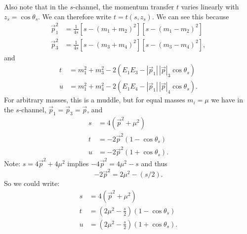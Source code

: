 \M
Also note that in the $s$-channel, the momentum transfer $t$ varies
linearly with $z_{s} = \cos\theta_{s}$. We can therefore write $t=t(s,z_{s})$.
We can see this because
\begin{subequations}
  \begin{align}
\vec{p}_{1}^{2} &= \frac{1}{4s}[s - (m_{1}+m_{2})^{2}][s - (m_{1}-m_{2})^{2}]\\
\vec{p}_{3}^{2} &= \frac{1}{4s}[s - (m_{3}+m_{4})^{2}][s - (m_{3}-m_{4})^{2}],
  \end{align}
\end{subequations}
and
\begin{subequations}
  \begin{align}
t &= m_{1}^{2} + m_{3}^{2} - 2(E_{1}E_{3} - |\vec{p}_{1}|\,|\vec{p}|_{3}\cos\theta_{s})\\
u &= m_{1}^{2} + m_{4}^{2} - 2(E_{1}E_{4} - |\vec{p}_{1}|\,|\vec{p}|_{4}\cos\theta_{s}).
  \end{align}
\end{subequations}
For arbitrary masses, this is a muddle, but for equal masses $m_{i}=\mu$
we have in the $s$-channel, $\vec{p}_{1}=\vec{p}_{3}=\vec{p}$, and
\begin{subequations}\label{eq:introduction:mandelstam-in-cm-frame-with-identical-masses}
  \begin{align}
    s &= 4(\vec{p}^{2}+\mu^{2})\\
    t &= -2\vec{p}^{2}(1 - \cos\theta_{s})\\
    u &= -2\vec{p}^{2}(1 + \cos\theta_{s}).
\end{align}
\end{subequations}
Note: $s=4\vec{p}^{2}+4\mu^{2}$ implies $-4\vec{p}^{2}=4\mu^{2}-s$ and
thus
\begin{equation}
-2\vec{p}^{2}=2\mu^{2}-(s/2).
\end{equation}
So we could write:
\begin{subequations}
  \begin{align}
    s &= 4(\vec{p}^{2}+\mu^{2})\\
    t &= \left(2\mu^{2} - \frac{s}{2}\right)(1 - \cos\theta_{s})\\
    u &= \left(2\mu^{2} - \frac{s}{2}\right)(1 + \cos\theta_{s}).
\end{align}
\end{subequations}

